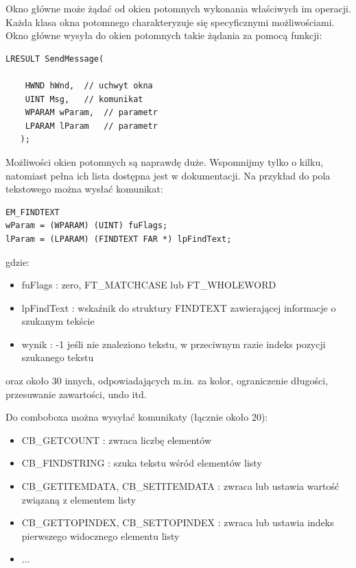 Okno główne może żądać od okien potomnych wykonania właściwych im operacji. Każda klasa okna
potomnego charakteryzuje się specyficznymi możliwościami. Okno główne wysyła do okien potomnych 
takie żądania za pomocą funkcji:

\begin{scriptsize}
\begin{verbatim}
LRESULT SendMessage(

    HWND hWnd,	// uchwyt okna
    UINT Msg,	// komunikat
    WPARAM wParam,	// parametr
    LPARAM lParam 	// parametr
   );
\end{verbatim}
\end{scriptsize}

Możliwości okien potomnych są naprawdę duże. Wspomnijmy tylko o kilku, natomiast pełna ich
lista dostępna jest w dokumentacji. Na przykład do pola tekstowego można wysłać komunikat:

\begin{scriptsize}
\begin{verbatim}
EM_FINDTEXT  
wParam = (WPARAM) (UINT) fuFlags; 
lParam = (LPARAM) (FINDTEXT FAR *) lpFindText;
\end{verbatim}
\end{scriptsize}

gdzie:
\begin{itemize}
	\item fuFlags : zero, FT\_MATCHCASE lub FT\_WHOLEWORD
	\item lpFindText : wskaźnik do struktury FINDTEXT zawierającej informacje o szukanym tekście
	\item wynik : -1 jeśli nie znaleziono tekstu, w przeciwnym razie indeks pozycji szukanego tekstu
\end{itemize}

oraz około 30 innych, odpowiadających m.in. za kolor, ograniczenie długości, przesuwanie zawartości, undo itd.

Do comboboxa można wysyłać komunikaty (łącznie około 20):
\begin{itemize}
	\item CB\_GETCOUNT : zwraca liczbę elementów
	\item CB\_FINDSTRING : szuka tekstu wśród elementów listy
	\item CB\_GETITEMDATA, CB\_SETITEMDATA : zwraca lub ustawia wartość związaną z elementem listy
	\item CB\_GETTOPINDEX, CB\_SETTOPINDEX : zwraca lub ustawia indeks pierwszego widocznego elementu listy
	\item $\ldots$
\end{itemize}

